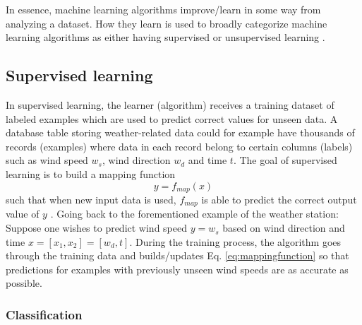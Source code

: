 	In essence, machine learning algorithms improve/learn in some way from analyzing a dataset. How they learn is used to broadly categorize machine learning algorithms as either having supervised or unsupervised learning \cite{BOOK:1}.
\subsection{Supervised learning}
	In supervised learning, the learner (algorithm) receives a training dataset of labeled examples which are used to predict correct values for unseen data\cite{BOOK:3}.  A database table storing weather-related data could for example have thousands of records (examples) where data in each record belong to certain columns (labels) such as wind speed $w_s$, wind direction $w_d$ and time $t$. The goal of supervised learning is to build a mapping function 
\begin{equation} \label{eq:mappingfunction}
	y = f_{map}(x)
\end{equation}
such that when new input data is used, $f_{map}$ is able to predict the correct output value of $y$ \cite{WEBSITE:3}. Going back to the forementioned example of the weather station: Suppose one wishes to predict wind speed $y = w_s$ based on wind direction and time $x = [x_1, x_2] = [w_d, t]$. During the training process, the algorithm goes through the training data and builds/updates Eq. \ref{eq:mappingfunction} so that predictions for examples with previously unseen wind speeds are as accurate as possible. 
\subsubsection{Classification}
